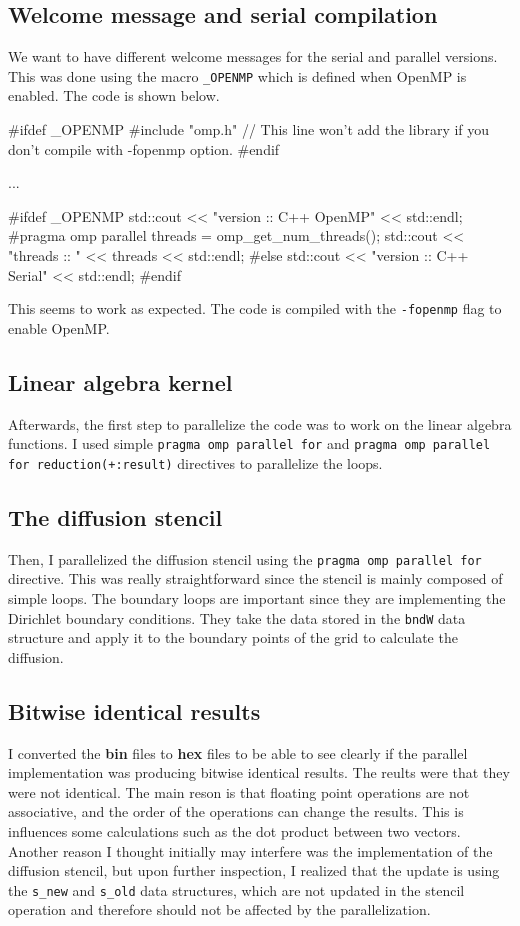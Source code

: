 \documentclass[unicode,11pt,a4paper,oneside,numbers=endperiod,openany]{scrartcl}
\begin{document}
\subsection*{Welcome message and serial compilation}
We want to have different welcome messages for the serial and parallel versions.
This was done using the macro \texttt{\_OPENMP} which is defined when OpenMP is
enabled. The code is shown below.
\begin{cppverbatim}
#ifdef _OPENMP
#include "omp.h" // This line won't add the library if you don't compile with -fopenmp option.
#endif

...

#ifdef _OPENMP
    std::cout << "version   :: C++ OpenMP" << std::endl;
#pragma omp parallel
    {
        threads = omp_get_num_threads();
    }
    std::cout << "threads   :: " << threads << std::endl;
#else
    std::cout << "version   :: C++ Serial" << std::endl;
#endif
\end{cppverbatim}    
This seems to work as expected. The code is compiled with the \texttt{-fopenmp}
flag to enable OpenMP.

\subsection*{Linear algebra kernel}
Afterwards, the first step to parallelize the code was to work on the linear
algebra functions. I used simple \texttt{pragma omp
parallel for}  and 
\texttt{pragma omp parallel for reduction(+:result)} directives to parallelize the loops.

\subsection*{The diffusion stencil}
Then, I parallelized the diffusion stencil using the \texttt{pragma omp
parallel for} directive. This was really straightforward since the stencil is
mainly composed of simple loops.
The boundary loops are important since they are implementing the Dirichlet
boundary conditions. They take the data stored in the \texttt{bndW} data
structure and apply it to the boundary points of the grid to calculate the
diffusion. 


\subsection*{Bitwise identical results}\label{sec:bitwise}
I converted the \textbf{bin} files to \textbf{hex} files to be able to see clearly if the parallel
implementation was producing bitwise identical results. The reults were that they
were not identical. The main reson is that floating
point operations are not associative, and the order of the operations can change
the results. This is influences some calculations such as the dot product
between two vectors. 
Another reason I thought initially may interfere was the implementation of the diffusion
stencil, but upon further inspection, I realized that the update is using the
\texttt{s\_new} and \texttt{s\_old} data structures, which are not updated in the
stencil operation and therefore should not be affected by the parallelization.
\end{document}
